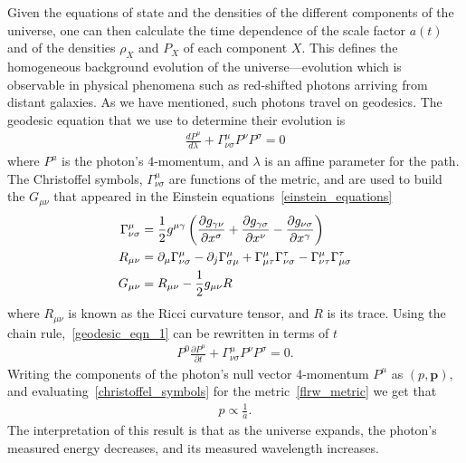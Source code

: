     Given the equations of state and the densities of the different
    components of the universe, one can then calculate the time dependence of the
    scale factor $a(t)$ and of the densities $\rho_X$ and $P_X$ of each component $X$.
    This defines the homogeneous background evolution of the universe---evolution
    which is observable in physical phenomena
    such as red-shifted photons arriving from distant galaxies.
    As we have mentioned, such
    photons travel on geodesics. The geodesic equation that we use to determine
    their evolution is
    \begin{align}\label{geodesic_eqn_1}
        \frac{dP^\mu}{d\lambda}+\Gamma^\mu_{\nu\sigma}P^\nu P^\sigma=0
    \end{align}
    where $P^a$ is the photon's $4$-momentum, and $\lambda$ is an affine parameter
    for the path.
    The Christoffel symbols, $\Gamma^\mu_{\nu\sigma}$ are functions of the
    metric, and are used to build the $G_{\mu\nu}$ that appeared in the Einstein equations~\eqref{einstein_equations}
    \begin{align}
        \Gamma^\mu_{\nu\sigma} &= \frac{1}{2}g^{\mu\gamma}\left(
        \frac{\partial g_{\gamma\nu}}{\partial x^{\sigma}}
        +\frac{\partial g_{\gamma\sigma}}{\partial x^{\nu}}
        -\frac{\partial g_{\nu\sigma}}{\partial x^{\gamma}}
        \right)\label{christoffel_symbols}\\
        R_{\mu \nu} &= \partial_\mu \Gamma^\mu_{\nu \sigma}-\partial_j\Gamma^\mu_{\sigma\mu}+
        \Gamma^\mu_{\mu \tau}\Gamma^\tau_{\nu \sigma}-\Gamma^\mu_{\nu \tau}\Gamma^\tau_{\mu \sigma}\label{ricci_tensor}\\
        G_{\mu\nu} &= R_{\mu\nu} - \frac{1}{2}g_{\mu\nu}R\label{einstein_tensor}
    \end{align}
    where $R_{\mu \nu}$ is known as the Ricci curvature tensor, and $R$ is its trace.
    Using the chain rule,~\eqref{geodesic_eqn_1} can be rewritten in terms of $t$
    \begin{align}
        P^{0}\frac{\partial P^\mu}{\partial t}+\Gamma^\mu_{\nu\sigma}P^\nu P^\sigma=0.
    \end{align}
    Writing the components of the photon's null vector 4-momentum $P^\mu$
    as $(p, \mathbf{p})$, and evaluating~\eqref{christoffel_symbols}
    for the metric~\eqref{flrw_metric} we get that
    \begin{align}\label{eq:redshifting}
        p\propto \frac{1}{a}.
    \end{align}
    The interpretation of this result is that as the universe expands,
    the photon's measured energy decreases, and its measured wavelength increases.


